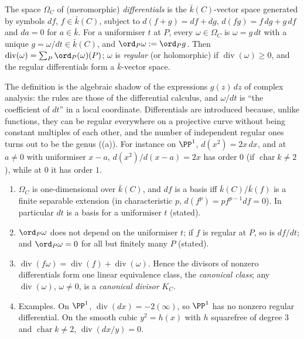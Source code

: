 \begin{definition}[differentials]\label{def:curves:differentials}
The space $\Omega_C$ of (meromorphic) \emph{differentials} is the $\bar k(C)$-vector space generated by symbols $df$, $f\in\bar k(C)$, subject to
$d(f+g)=df+dg$, $d(fg)=f\,dg+g\,df$ and $da=0$ for $a\in\bar k$. For a uniformiser $t$ at $P$, every $\omega\in\Omega_C$ is $\omega=g\,dt$ with a unique
$g=\omega/dt\in\bar k(C)$, and $\ord_P\omega:=\ord_Pg$. Then $\operatorname{div}(\omega)=\sum_P\ord_P(\omega)(P)$; $\omega$ is \emph{regular} (or holomorphic) if
$\operatorname{div}(\omega)\ge0$, and the regular differentials form a $\bar k$-vector space.
\end{definition}

The definition is the algebraic shadow of the expressions $g(z)\,dz$ of complex analysis: the rules are those of the differential calculus, and $\omega/dt$
is ``the coefficient of $dt$'' in a local coordinate. Differentials are introduced because, unlike functions, they can be regular everywhere on a projective
curve without being constant multiples of each other, and the number of independent regular ones turns out to be the genus ((a)).
For instance on $\PP^1$, $d(x^2)=2x\,dx$, and at $a\ne0$ with uniformiser $x-a$, $d(x^2)/d(x-a)=2x$ has order $0$ (if $\operatorname{char}k\ne2$), while at $0$ it has
order $1$.

\begin{proposition}\label{prop:curves:differentials}
\leavevmode
\begin{enumerate}[label=(\roman*)]
\item $\Omega_C$ is one-dimensional over $\bar k(C)$, and $df$ is a basis iff $\bar k(C)/\bar k(f)$ is a finite separable extension (in characteristic $p$,
$d(f^p)=pf^{p-1}df=0$). In particular $dt$ is a basis for a uniformiser $t$ (stated).
\item $\ord_P\omega$ does not depend on the uniformiser $t$; if $f$ is regular at $P$, so is $df/dt$; and $\ord_P\omega=0$ for all but finitely many $P$ (stated).
\item $\operatorname{div}(f\omega)=\operatorname{div}(f)+\operatorname{div}(\omega)$. Hence the divisors of nonzero differentials form one linear equivalence class, the
\emph{canonical class}; any $\operatorname{div}(\omega)$, $\omega\ne0$, is a \emph{canonical divisor} $K_C$.
\item Examples. On $\PP^1$, $\operatorname{div}(dx)=-2(\infty)$, so $\PP^1$ has no nonzero regular differential. On the smooth cubic $y^2=h(x)$ with $h$
squarefree of degree $3$ and $\operatorname{char}k\ne2$, $\operatorname{div}(dx/y)=0$.
\end{enumerate}
\end{proposition}

